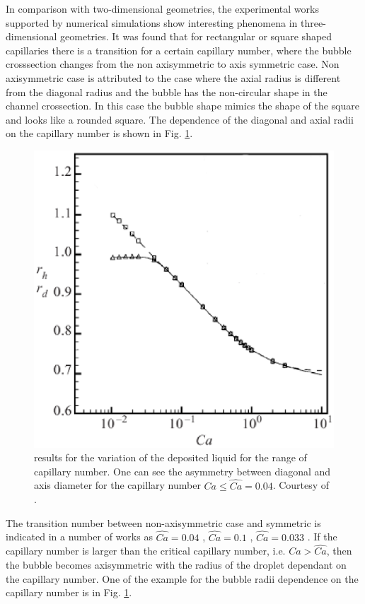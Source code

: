 \documentclass{article}
\begin{document}
In comparison with two-dimensional geometries, the experimental works
\cite{shikazono-square,cerro-bubble-train} supported by numerical simulations \cite{heil-threedim,
wang-non-circular} show interesting phenomena in three-dimensional geometries. It was found
\cite{heil-threedim,wong-films} that for rectangular
or square shaped capillaries there is a transition for a
certain capillary number, where the bubble crosssection changes from the non axisymmetric to axis
symmetric case. Non axisymmetric case is attributed to the case where the axial radius is
different from the
diagonal radius and the bubble has the non-circular shape in the channel crossection. In this case
the bubble shape mimics the shape of the square and looks like a rounded square. The dependence
of the diagonal and axial radii on the capillary number is shown in Fig. 
\ref{fig:heil:three:dim}.
\begin{figure}[ht]
\includegraphics[width=\textwidth]{Figures/capillary_width_heil.eps}
\caption{\citet{heil-threedim} results for the variation of the deposited liquid for the range of
capillary number. One can see the asymmetry between diagonal and axis diameter for the capillary
number $Ca\leq\hat{Ca}=0.04$. Courtesy of \citet{heil-threedim}. \label{fig:heil:three:dim}}
\end{figure}
The transition number between non-axisymmetric case and symmetric is indicated in a number of
works as $\widehat{Ca}=0.04$ \cite{cerro-bubble-train},
$\widehat{Ca}=0.1$
\cite{cerro-space,wang-non-circular}, $\widehat{Ca}=0.033$ \cite{heil-threedim}. If the capillary
number is larger
than
the critical capillary number, i.e. $Ca>\widehat{Ca}$, then the bubble becomes axisymmetric with the
radius of the droplet dependant on the capillary number. One of the example for the bubble radii
dependence on the capillary number is in Fig. \ref{fig:heil:three:dim}.
\end{document}
